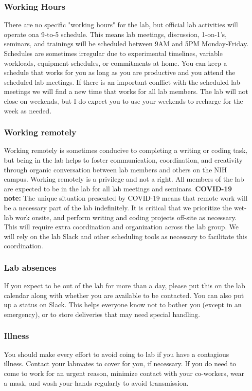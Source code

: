 \documentclass[10pt, letterpaper, twocolumn]{article} %
\begin{document}
\subsubsection{Working Hours}
There are no specific "working hours" for the lab, but official lab activities will operate ona 9-to-5 schedule. This means lab meetings, discussion, 1-on-1's, seminars, and trainings will be scheduled between 9AM and 5PM Monday-Friday. Schedules are sometimes irregular due to experimental timelines, variable workloads, equipment schedules, or commitments at home. You can keep a schedule that works for you as long as you are productive and you attend the scheduled lab meetings. If there is an important conflict with the scheduled lab meetings we will find a new time that works for all lab members. The lab will not close on weekends, but I do expect you to use your weekends to recharge for the week as needed.

\subsubsection{Working remotely} Working remotely is sometimes conducive to completing a writing or coding task, but being in the lab helps to foster communication, coordination, and creativity through organic conversation between lab members and others on the NIH campus. Working remotely is a privilege and not a right. All members of the lab are expected to be in the lab for all lab meetings and seminars. {\bfseries COVID-19 note:} The unique situation presented by COVID-19 means that remote work will be a necessary part of the lab indefinitely. It is critical that we prioritize the wet-lab work onsite, and perform writing and coding projects off-site as necessary. This will require extra coordination and organization across the lab group. We will rely on the lab Slack and other scheduling tools as necessary to facilitate this coordination.

\subsubsection{Lab absences} If you expect to be out of the lab for more than a day, please put this on the lab calendar along with whether you are available to be contacted. You can also put up a status on Slack. This helps everyone know not to bother you (except in an emergency), or to store deliveries that may need special handling.

\subsubsection{Illness} You should make every effort to avoid coing to lab if you have a contagious illness. Contact your labmates to cover for you, if necessary. If you do need to come to work for an urgent reason, minimize contact with your co-workers, wear a mask, and wash your hands regularly to avoid transmission.
\end{document}
